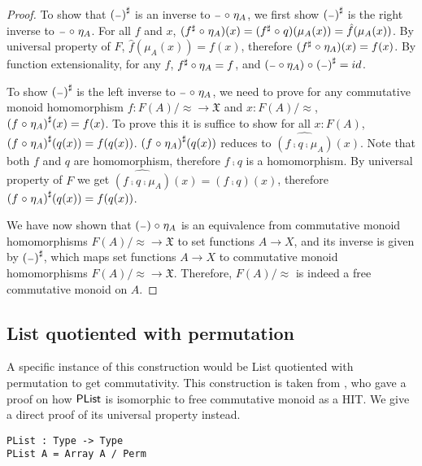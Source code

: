\begin{proof}
    To show that ${({\scriptstyle{-}})}^{\sharp}$ is an inverse to ${\scriptstyle{-}} \mathrel{\circ} \eta_A$,
    we first show ${({\scriptstyle{-}})}^{\sharp}$ is the right inverse to ${\scriptstyle{-}} \mathrel{\circ} \eta_A$.
    For all $f$ and $x$, $({f}^{\sharp} \mathrel{\circ} \eta_A)(x) = ({f}^{\sharp} \mathrel{\circ} q)(\mu_A(x)) = \hat{f}(\mu_A(x))$.
    By universal property of $F$, $\hat{f}(\mu_A(x)) = f(x)$, therefore $({f}^{\sharp} \mathrel{\circ} \eta_A)(x) = f(x)$.
    By function extensionality, for any $f$, ${f}^{\sharp} \circ \eta_A = f$,
    and $({\scriptstyle{-}} \circ \eta_A) \mathrel{\circ} {({\scriptstyle{-}})}^{\sharp} = id$.

    To show ${({\scriptstyle{-}})}^{\sharp}$ is the left inverse to ${\scriptstyle{-}} \mathrel{\circ} \eta_A$, we need to prove
    for any commutative monoid homomorphism $f : F(A) / \approx \to \mathfrak{X}$ and $x : F(A) / \approx$,
    ${(f \mathrel{\circ} \eta_A)}^{\sharp}(x) = f(x)$. To prove this it is suffice to show for all $x : F(A)$,
    ${(f \mathrel{\circ} \eta_A)}^{\sharp}(q(x)) = f(q(x))$. 
    ${(f \mathrel{\circ} \eta_A)}^{\sharp}(q(x))$ reduces to $\widehat{(f \comp q \comp \mu_A)}(x)$.
    Note that both $f$ and $q$ are homomorphism, therefore $f \comp q$ is a homomorphism. By
    universal property of $F$ we get $\widehat{(f \comp q \comp \mu_A)}(x) = (f \comp q)(x)$,
    therefore ${(f \mathrel{\circ} \eta_A)}^{\sharp}(q(x)) = f(q(x))$.

    We have now shown that $({\scriptstyle{-}}) \mathrel{\circ} \eta_A$ is an equivalence from
    commutative monoid homomorphisms $F(A) / \approx \to \mathfrak{X}$
    to set functions $A \to X$, and its inverse is given by ${({\scriptstyle{-}})}^{\sharp}$, which maps set
    functions $A \to X$ to commutative monoid homomorphisms $F(A) / \approx \to \mathfrak{X}$.
    Therefore, $F(A) / \approx$ is indeed a free commutative monoid on $A$.
\end{proof}


\subsection{List quotiented with permutation}\label{cmon:plist}
A specific instance of this construction would be List quotiented with permutation to get commutativity.
This construction is taken from \cite{joram_et_al:LIPIcs.ITP.2023.20}, who gave a proof on how
$\operatorname{\mathsf{PList}}$ is isomorphic to free commutative monoid as a HIT. We give a direct proof of its universal
property instead.

\begin{lstlisting}
PList : Type -> Type
PList A = Array A / Perm
\end{lstlisting}

